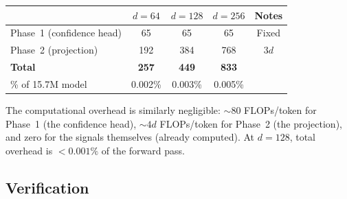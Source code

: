 \documentclass[11pt,a4paper]{article}
\theoremstyle{definition}
\theoremstyle{remark}
\begin{document}
\begin{center}
\begin{tabular}{lcccc}
\toprule
& $d = 64$ & $d = 128$ & $d = 256$ & Notes \\
\midrule
Phase~1 (confidence head) & 65 & 65 & 65 & Fixed \\
Phase~2 (projection) & 192 & 384 & 768 & $3d$ \\
\textbf{Total} & \textbf{257} & \textbf{449} & \textbf{833} & \\
\% of 15.7M model & 0.002\% & 0.003\% & 0.005\% & \\
\bottomrule
\end{tabular}
\end{center}

The computational overhead is similarly negligible: ${\sim}80$ 
FLOPs/token for Phase~1 (the confidence head), ${\sim}4d$ FLOPs/token 
for Phase~2 (the projection), and zero for the signals themselves 
(already computed). At $d = 128$, total overhead is $< 0.001\%$ of 
the forward pass.

\subsection{Verification}\label{sec:proprio_verification}
\end{document}

